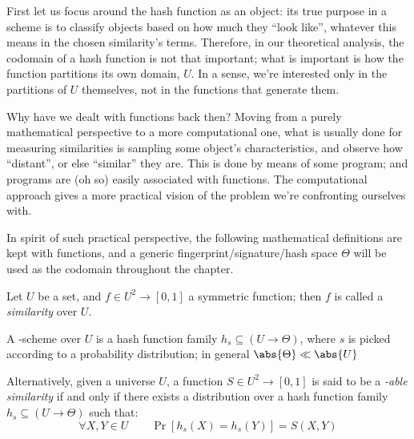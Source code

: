 
First let us focus around the hash function as an object: its true purpose in a scheme is to classify objects based on how much they ``look like'', whatever this means in the chosen similarity's terms. Therefore, in our theoretical analysis, the codomain of a hash function is not that important; what is important is how the function partitions its own domain, $U$. In a sense, we're interested only in the partitions of $U$ themselves, not in the functions that generate them.

Why have we dealt with functions back then? Moving from a purely mathematical perspective to a more computational one, what is usually done for measuring similarities is sampling some object's characteristics, and observe how ``distant'', or else ``similar'' they are. This is done by means of some program; and programs are (oh so) easily associated with functions. The computational approach gives a more practical vision of the problem we're confronting ourselves with.

In spirit of such practical perspective, the following mathematical definitions are kept with functions, and a generic fingerprint/signature/hash space $\Theta$ will be used as the codomain throughout the chapter.



\begin{definition}
    Let $U$ be a set, and $f \in U^2 \to [0, 1]$ a symmetric function; then $f$ is called a \emph{similarity} over $U$.
\end{definition}

\begin{definition}
    A \lsh-scheme over $U$ is a hash function family $h_s \subseteq (U \to \Theta)$, where $s$ is picked according to a probability distribution; in general $\abs{\Theta} \ll \abs{U}$
    
    Alternatively, given a universe $U$, a function $S \in U^2 \to [0, 1]$ is said to be a \emph{\lsh-able similarity} if and only if there exists a distribution over a hash function family $h_s \subseteq (U \to \Theta)$ such that: 
    \begin{equation}
        \forall X, Y \in U \qquad \Pr[h_s(X) = h_s(Y)] = S(X, Y)
    \end{equation}
\end{definition}

